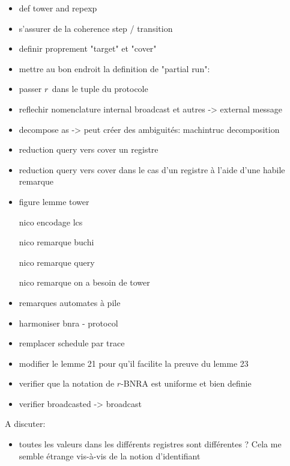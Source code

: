\begin{itemize}
\item def tower and repexp
\item s'assurer de la coherence step / transition
\item definir proprement "target" et "cover"
\item mettre au bon endroit la definition de "partial run": 
    \item passer $r$ dans le tuple du protocole
    \item reflechir nomenclature internal broadcast et autres -> external message
    \item decompose as -> peut créer des ambiguités: machintruc decomposition 
    \item reduction query vers cover un registre
    \item reduction query vers cover dans le cas d'un registre à l'aide d'une habile remarque
    \item figure lemme tower
    \item[nico] encodage lcs
    \item[nico] remarque buchi
    \item[nico] remarque query 
    \item[nico] remarque on a besoin de tower
    \item remarques automates à pile    
    \item harmoniser bnra - protocol
    \item remplacer schedule par trace
    \item modifier le lemme 21 pour qu'il facilite la preuve du lemme 23
    \item verifier que la notation de $r$-BNRA est uniforme et bien definie
    \item  verifier broadcasted -> broadcast
\end{itemize}

A discuter:
\begin{itemize}
\item toutes les valeurs dans les différents registres sont différentes ? Cela me semble étrange vis-à-vis de la notion d'identifiant
\end{itemize}